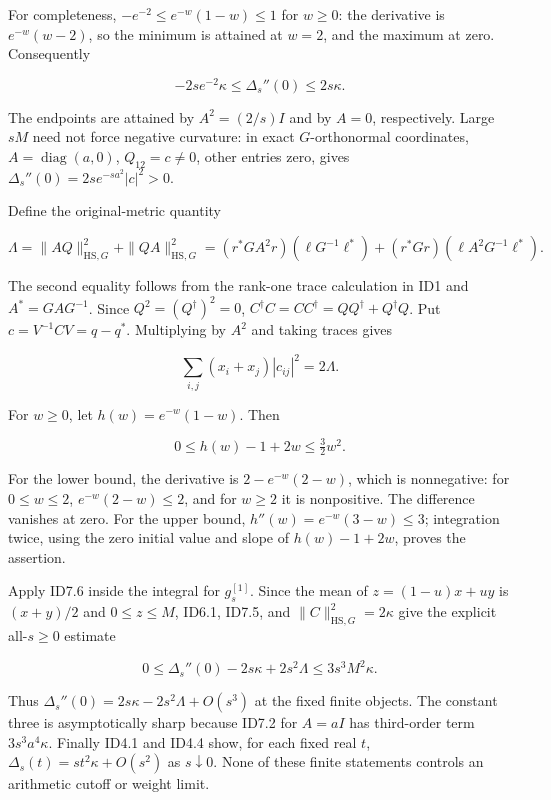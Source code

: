 For completeness, \(-e^{-2}\le e^{-w}(1-w)\le1\) for \(w\ge0\): the derivative is \(e^{-w}(w-2)\), so the minimum is attained at \(w=2\), and the maximum at zero. Consequently

\[
-2s e^{-2}\kappa\le\Delta_s''(0)\le2s\kappa. \tag{ID7.3}
\]

The endpoints are attained by \(A^2=(2/s)I\) and by \(A=0\), respectively. Large \(sM\) need not force negative curvature: in exact \(G\)-orthonormal coordinates, \(A=\operatorname{diag}(a,0)\), \(Q_{12}=c\ne0\), other entries zero, gives \(\Delta_s''(0)=2s e^{-sa^2}|c|^2>0\).

Define the original-metric quantity

\[
\Lambda=\|AQ\|_{\mathrm{HS},G}^2+\|QA\|_{\mathrm{HS},G}^2
=(r^*GA^2r)(\ell G^{-1}\ell^*)
+(r^*Gr)(\ell A^2G^{-1}\ell^*). \tag{ID7.4}
\]

The second equality follows from the rank-one trace calculation in ID1 and \(A^*=GAG^{-1}\). Since \(Q^2=(Q^\dagger)^2=0\), \(C^\dagger C=CC^\dagger=QQ^\dagger+Q^\dagger Q\). Put \(c=V^{-1}CV=q-q^*\). Multiplying by \(A^2\) and taking traces gives

\[
\sum_{i,j}(x_i+x_j)|c_{ij}|^2=2\Lambda. \tag{ID7.5}
\]

For \(w\ge0\), let \(h(w)=e^{-w}(1-w)\). Then

\[
0\le h(w)-1+2w\le\tfrac32w^2. \tag{ID7.6}
\]

For the lower bound, the derivative is \(2-e^{-w}(2-w)\), which is nonnegative: for \(0\le w\le2\), \(e^{-w}(2-w)\le2\), and for \(w\ge2\) it is nonpositive. The difference vanishes at zero. For the upper bound, \(h''(w)=e^{-w}(3-w)\le3\); integration twice, using the zero initial value and slope of \(h(w)-1+2w\), proves the assertion.

Apply ID7.6 inside the integral for \(g_s^{[1]}\). Since the mean of \(z=(1-u)x+uy\) is \((x+y)/2\) and \(0\le z\le M\), ID6.1, ID7.5, and \(\|C\|_{\mathrm{HS},G}^2=2\kappa\) give the explicit all-\(s\ge0\) estimate

\[
\boxed{0\le\Delta_s''(0)-2s\kappa+2s^2\Lambda
\le3s^3M^2\kappa.} \tag{ID7.7}
\]

Thus \(\Delta_s''(0)=2s\kappa-2s^2\Lambda+O(s^3)\) at the fixed finite objects. The constant three is asymptotically sharp because ID7.2 for \(A=aI\) has third-order term \(3s^3a^4\kappa\). Finally ID4.1 and ID4.4 show, for each fixed real \(t\), \(\Delta_s(t)=st^2\kappa+O(s^2)\) as \(s\downarrow0\). None of these finite statements controls an arithmetic cutoff or weight limit.

